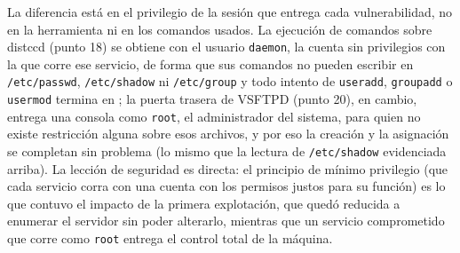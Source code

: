 \begin{respuesta}
La diferencia está en el privilegio de la sesión que entrega cada vulnerabilidad, no en la herramienta ni en los comandos usados. La ejecución de comandos sobre distccd (punto 18) se obtiene con el usuario \texttt{daemon}, la cuenta sin privilegios con la que corre ese servicio, de forma que sus comandos no pueden escribir en \texttt{/etc/passwd}, \texttt{/etc/shadow} ni \texttt{/etc/group} y todo intento de \texttt{useradd}, \texttt{groupadd} o \texttt{usermod} termina en ; la puerta trasera de VSFTPD (punto 20), en cambio, entrega una consola como \texttt{root}, el administrador del sistema, para quien no existe restricción alguna sobre esos archivos, y por eso la creación y la asignación se completan sin problema (lo mismo que la lectura de \texttt{/etc/shadow} evidenciada arriba). La lección de seguridad es directa: el principio de mínimo privilegio (que cada servicio corra con una cuenta con los permisos justos para su función) es lo que contuvo el impacto de la primera explotación, que quedó reducida a enumerar el servidor sin poder alterarlo, mientras que un servicio comprometido que corre como \texttt{root} entrega el control total de la máquina.
\end{respuesta}
